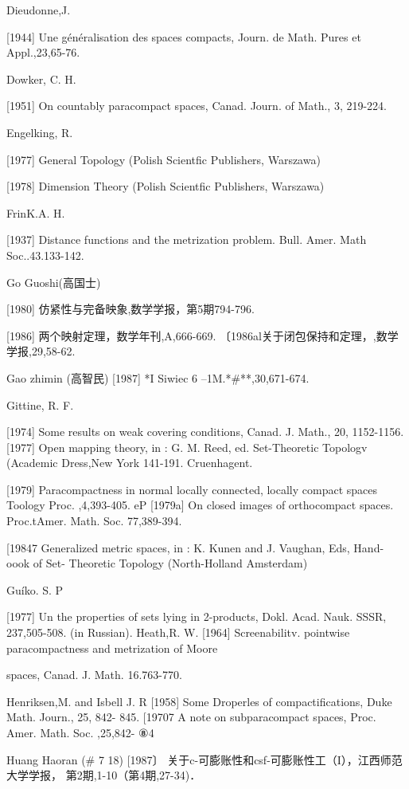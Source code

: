 \documentclass[main.tex]{subfiles}
\begin{document}
\noindent Dieudonne,J.

[1944] Une généralisation des spaces compacts, Journ. de Math. Pures et Appl.,23,65-76.

\noindent Dowker, C. H.

[1951] On countably paracompact spaces, Canad. Journ. of Math., 3, 219-224.

\noindent Engelking, R.

[1977] General Topology (Polish Scientfic Publishers, Warszawa)

[1978] Dimension Theory (Polish Scientfic Publishers, Warszawa)


\noindent FrinK.A. H.

[1937] Distance functions and the metrization problem. Bull. Amer. Math
Soc..43.133-142.

\noindent Go Guoshi(高国士)

[1980] 仿紧性与完备映象,数学学报，第5期794-796.

[1986] 两个映射定理，数学年刊,A,666-669.
〔1986al关于闭包保持和定理，,数学学报,29,58-62.

\noindent Gao zhimin (高智民)
[1987] *I Siwiec 6 --1M.*\#**,30,671-674.

\noindent Gittine, R. F.

[1974]
Some results on weak covering conditions, Canad. J. Math., 20,
1152-1156.
[1977]
Open mapping theory, in : G. M. Reed, ed. Set-Theoretic Topologv
(Academic Dress,New York 141-191.
Cruenhagent.

[1979]
Paracompactness in normal locally connected,
locally compact
spaces Toology Proc.
,4,393-405.
eP [1979a]
On closed images of orthocompact
spaces. Proc.tAmer. Math. Soc.
77,389-394.

[19847 Generalized metric spaces, in : K. Kunen and J. Vaughan, Eds, Hand-
oook of Set- Theoretic Topology (North-Holland Amsterdam)

Guíko. S. P

[1977]
Un
the properties of sets lying in 2-products, Dokl. Acad. Nauk.
SSSR, 237,505-508. (in Russian).
Heath,R. W.
[1964]
Screenabilitv. pointwise paracompactness and
metrization of Moore

spaces, Canad. J. Math. 16.763-770.

\noindent Henriksen,M. and Isbell J. R
[1958]
Some Droperles
of compactifications, Duke Math. Journ., 25, 842-
845.
[19707 A note on subparacompact spaces, Proc. Amer. Math. Soc. ,25,842-
⑧4

\noindent Huang Haoran (# 7 18)
[1987〕 关于c-可膨账性和csf-可膨账性工（I），江西师范大学学报，
第2期,1-10（第4期,27-34)．
\end{document}
